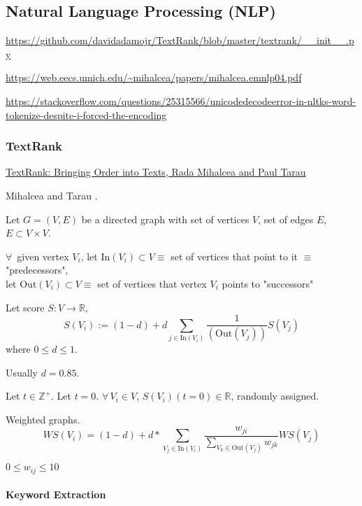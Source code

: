 \documentclass[10pt]{amsart}
\begin{document}
\begin{multicols*}{2}
\part{Natural Language Processing (NLP) }

\url{https://github.com/davidadamojr/TextRank/blob/master/textrank/__init__.py}

\url{https://web.eecs.umich.edu/~mihalcea/papers/mihalcea.emnlp04.pdf}

\url{https://stackoverflow.com/questions/25315566/unicodedecodeerror-in-nltks-word-tokenize-despite-i-forced-the-encoding}

\section{TextRank}

\href{https://web.eecs.umich.edu/~mihalcea/papers/mihalcea.emnlp04.pdf}{TextRank: Bringing Order into Texts, Rada Mihalcea and Paul Tarau}

Mihalcea and Tarau \cite{MiTa}.  

Let $G=(V,E)$ be a directed graph with set of vertices $V$, set of edges $E$, $E\subset V \times V$.  

$\forall \, $ given vertex $V_i$, let $\text{In}(V_i) \subset V \equiv $ set of vertices that point to it $\equiv $ "predecessors", \\
let $\text{Out}(V_i) \subset V \equiv $ set of vertices that vertex $V_i$ points to "successors"

Let score $S:V \to \mathbb{R}$, 
\begin{equation}
 S(V_i) := (1-d) + d \sum_{j\in \text{In}(V_i) } \frac{1}{ (\text{Out}(V_j))} S(V_j)
\end{equation}
where $0\leq d\leq 1$.  

Usually $d=0.85$.  

Let $t\in \mathbb{Z}^+$.  Let $t=0$.  $\forall \, V_i \in V$, $S(V_i)(t=0) \in \mathbb{R}$, randomly assigned.  

Weighted graphs.  
\begin{equation}
WS(V_i) = (1-d) + d* \sum_{V_j \in \text{In}(V_i) } \frac{w_{ji} }{ \sum_{V_k \in \text{Out}(V_j) } w_{jk} } WS(V_j)
\end{equation}

$0\leq w_{ij} \leq 10$  

\subsection{Keyword Extraction}


\end{multicols*}
\end{document}
